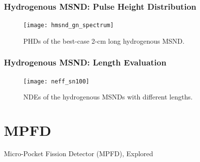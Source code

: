 \documentclass[fleqn]{beamer}
\begin{document}
 \begin{frame}
  \frametitle{Hydrogenous MSND: Pulse Height Distribution}
  \begin{figure}[h!tbp]
\centering
\texttt{[image: hmsnd\_gn\_spectrum]}
\caption{PHDs of the best-case 2-cm long hydrogenous MSND.}
\label{ng_spectra}
\end{figure}
 \end{frame}
 
 \begin{frame}
  \frametitle{Hydrogenous MSND: Length Evaluation}
  \begin{figure}[h!tb]
\centering
\texttt{[image: neff\_sn100]}
\caption{NDEs of the hydrogenous MSNDs with different lengths.}
\label{gamma_length}
\end{figure}
 \end{frame}
 
% 


 \section{MPFD}
 \begin{frame}
 \centering
  Micro-Pocket Fission Detector (MPFD), Explored
 \end{frame}
 
\end{document}
